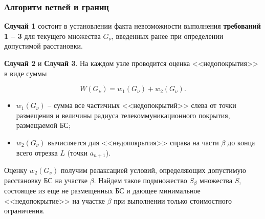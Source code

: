\begin{frame}
    \frametitle{Алгоритм ветвей и границ}
    \justifying

    \textbf{Случай 1}  состоит в установлении факта невозможности выполнения \textbf{требований 1 -- 3} для текущего множества $G_\nu$,  введенных ранее при определении допустимой расстановки.
    \medskip

    \textbf{Случай 2} и \textbf{Случай 3}. На каждом узле проводится оценка <<недопокрытия>> в виде суммы

    \begin{displaymath}
        W\left(G_\nu\right) = w_1\left(G_\nu \right) + w_2\left(G_\nu \right). 
    \end{displaymath}

    \begin{itemize}
        \item $w_1 \left(G_\nu \right)$ -- сумма все частичных <<недопокрытий>> слева от точки размещения и величины радиуса телекоммуникационного покрытия, размещаемой БС;
        \item $w_2 \left(G_\nu \right)$ вычисляется для <<недопокрытия>> справа на части $\beta$ до конца всего отрезка $L$ (точки $a_{n+1}$).
    \end{itemize}
    Оценку $w_2 \left(G_\nu \right)$ получим релаксацией условий, определяющих допустимую расстановку БС на участке $\beta$. Найдем такое подмножество $S_\beta$ множества $S$, состоящее из еще не размещенных БС и дающее минимальное <<недопокрытие>> на участке $\beta$ при выполнении только стоимостного ограничения. 
    
\end{frame}

